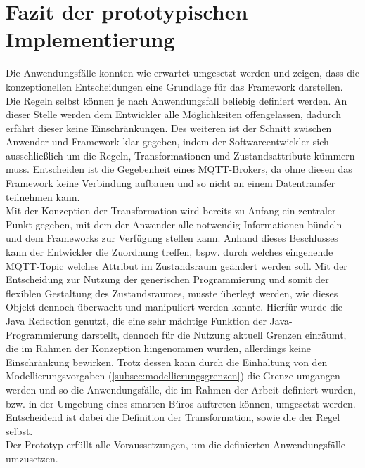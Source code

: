     \section{Fazit der prototypischen Implementierung}
        Die Anwendungsfälle konnten wie erwartet umgesetzt werden und zeigen, dass die konzeptionellen Entscheidungen eine Grundlage für das 
        Framework darstellen. Die Regeln selbst können je nach Anwendungsfall beliebig definiert werden. An dieser Stelle werden dem 
        Entwickler alle Möglichkeiten offengelassen, dadurch erfährt dieser keine Einschränkungen. Des weiteren ist der Schnitt zwischen 
        Anwender und Framework klar gegeben, indem der Softwareentwickler sich ausschließlich um die Regeln, Transformationen und Zustandsattribute 
        kümmern muss. Entscheiden ist die Gegebenheit eines \acs{MQTT}-Brokers, da ohne diesen das Framework keine Verbindung aufbauen und so nicht an 
        einem Datentransfer teilnehmen kann. 
        \\
        \linebreak
        Mit der Konzeption der Transformation wird bereits zu Anfang ein zentraler Punkt gegeben, mit dem der Anwender alle notwendig Informationen 
        bündeln und dem Frameworks zur Verfügung stellen kann. Anhand dieses Beschlusses kann der Entwickler die Zuordnung treffen, bspw. durch welches 
        eingehende \acs{MQTT}-Topic welches Attribut im Zustandsraum geändert werden soll. Mit der Entscheidung zur Nutzung der generischen Programmierung 
        und somit der flexiblen Gestaltung des Zustandsraumes, musste überlegt werden, wie dieses Objekt dennoch überwacht und manipuliert werden konnte. 
        Hierfür wurde die Java Reflection genutzt, die eine sehr mächtige Funktion der Java-Programmierung darstellt, dennoch für die Nutzung aktuell 
        Grenzen einräumt, die im Rahmen der Konzeption hingenommen wurden, allerdings keine Einschränkung bewirken. Trotz dessen kann durch die Einhaltung 
        von den Modellierungsvorgaben (\ref{subsec:modellierungsgrenzen}) die Grenze umgangen werden und so die Anwendungsfälle, die im Rahmen der Arbeit 
        definiert wurden, bzw. in der Umgebung eines smarten Büros auftreten können, umgesetzt werden. Entscheidend ist dabei die Definition der 
        Transformation, sowie die der Regel selbst. 
        \\
        \linebreak
        Der Prototyp erfüllt alle Voraussetzungen, um die definierten Anwendungsfälle umzusetzen.
    
